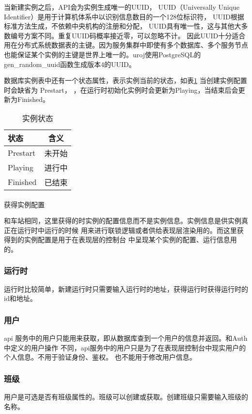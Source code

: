 当新建实例之后，API会为实例生成唯一的UUID，
UUID（Universally Unique Identifier）是用于计算机体系中以识别信息数目的一个128位标识符，
UUID根据标准方法生成，不依赖中央机构的注册和分配，
UUID具有唯一性，这与其他大多数编号方案不同。重复UUID码概率接近零，可以忽略不计\cite{rfc4122}。
因此UUID十分适合用在分布式系统数据表的主键。因为服务集群中即使有多个数据库、多个服务节点
也能保证某个实例的主键是世界上唯一的。uroj使用PostgreSQL的gen\_random\_uuid函数生成版本4的UUID\cite{group2020documentation}。

数据库实例表中还有一个状态属性，表示实例当前的状态，如表\ref{ins_state} 当创建实例配置时会缺省为 Prestart，
，在运行时初始化实例时会更新为Playing，当结束后会更新为Finished。

\begin{table}[htpb!]
    \centering
    \caption{\label{ins_state}实例状态}
    \begin{tabular}{lc}
        \toprule
        状态     & 含义   \\
        \midrule
        Prestart & 未开始 \\
        Playing  & 进行中 \\
        Finished & 已结束 \\
        \bottomrule
    \end{tabular}
\end{table}

\paragraph{}获得实例配置

和车站相同，这里获得的时实例的配置信息而不是实例信息。实例信息是供实例真正在运行时中运行的时候
用来进行联锁逻辑或者供给表现层渲染用的。而这里获得到的实例配置是用于在表现层的控制台
中呈现某个实例的配置、运行信息用的。

\subsubsection{运行时}
运行时比较简单，新建运行时只需要输入运行时的地址，获得运行时获得运行时的id和地址。

\subsubsection{用户}
api 服务中的用户只能用来获取，即从数据库查到一个用户的信息并返回。和Auth中定义的用户操作
不同，api服务中的用户只是为了在表现层控制台中现实用户的个人信息。不用于验证身份、鉴权。
也不能用于修改用户信息。

\subsubsection{班级}
用户是可选是否有班级属性的。班级可以创建或获取。创建班级只需要输入班级的名称。